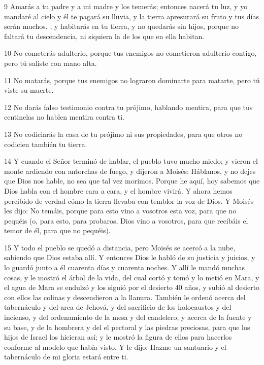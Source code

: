 \par 9 Amarás a tu padre y a mi madre y los temerás; entonces nacerá tu luz, y yo mandaré al cielo y él te pagará su lluvia, y la tierra apresurará su fruto y tus días serán muchos. , y habitarás en tu tierra, y no quedarás sin hijos, porque no faltará tu descendencia, ni siquiera la de los que en ella habitan.

\par 10 No cometerás adulterio, porque tus enemigos no cometieron adulterio contigo, pero tú saliste con mano alta.

\par 11 No matarás, porque tus enemigos no lograron dominarte para matarte, pero tú viste su muerte.

\par 12 No darás falso testimonio contra tu prójimo, hablando mentira, para que tus centinelas no hablen mentira contra ti.

\par 13 No codiciarás la casa de tu prójimo ni sus propiedades, para que otros no codicien también tu tierra.

\par 14 Y cuando el Señor terminó de hablar, el pueblo tuvo mucho miedo; y vieron el monte ardiendo con antorchas de fuego, y dijeron a Moisés: Háblanos, y no dejes que Dios nos hable, no sea que tal vez morimos. Porque he aquí, hoy sabemos que Dios habla con el hombre cara a cara, y el hombre vivirá. Y ahora hemos percibido de verdad cómo la tierra llevaba con temblor la voz de Dios. Y Moisés les dijo: No temáis, porque para esto vino a vosotros esta voz, para que no pequéis (o, para esto, para probaros, Dios vino a vosotros, para que recibáis el temor de él, para que no pequéis).

\par 15 Y todo el pueblo se quedó a distancia, pero Moisés se acercó a la nube, sabiendo que Dios estaba allí. Y entonces Dios le habló de su justicia y juicios, y lo guardó junto a él cuarenta días y cuarenta noches. Y allí le mandó muchas cosas, y le mostró el árbol de la vida, del cual cortó y tomó y lo metió en Mara, y el agua de Mara se endulzó y los siguió por el desierto 40 años, y subió al desierto con ellos las colinas y descendieron a la llanura. También le ordenó acerca del tabernáculo y del arca de Jehová, y del sacrificio de los holocaustos y del incienso, y del ordenamiento de la mesa y del candelero, y acerca de la fuente y su base, y de la hombrera y del el pectoral y las piedras preciosas, para que los hijos de Israel los hicieran así; y le mostró la figura de ellos para hacerlos conforme al modelo que había visto. Y le dijo: Hazme un santuario y el tabernáculo de mi gloria estará entre ti.

